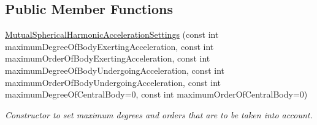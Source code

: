 \subsection*{Public Member Functions}
\begin{DoxyCompactItemize}
\item 
\hyperlink{classtudat_1_1simulation__setup_1_1MutualSphericalHarmonicAccelerationSettings_a6a4f833009fad7dedec6119952082995}{Mutual\+Spherical\+Harmonic\+Acceleration\+Settings} (const int maximum\+Degree\+Of\+Body\+Exerting\+Acceleration, const int maximum\+Order\+Of\+Body\+Exerting\+Acceleration, const int maximum\+Degree\+Of\+Body\+Undergoing\+Acceleration, const int maximum\+Order\+Of\+Body\+Undergoing\+Acceleration, const int maximum\+Degree\+Of\+Central\+Body=0, const int maximum\+Order\+Of\+Central\+Body=0)
\begin{DoxyCompactList}\small\item\em Constructor to set maximum degrees and orders that are to be taken into account. \end{DoxyCompactList}\end{DoxyCompactItemize}

